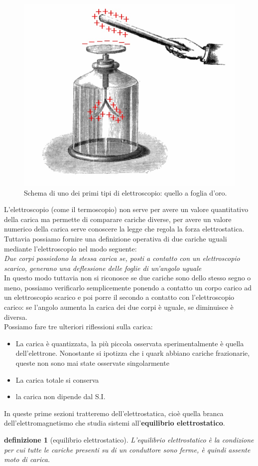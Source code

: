 \documentclass[10pt,a4paper]{article}
\newtheorem{definizione}{definizione}
\begin{document}
\begin{figure}[h!]
	\centering
	\includegraphics[width=0.4\linewidth]{images/elettroscopio}
	\caption{Schema di uno dei primi tipi di elettroscopio: quello a foglia d'oro.}
	\label{fig:elettroscopio}
\end{figure}
\FloatBarrier
L'elettroscopio (come il termoscopio) non serve per avere un valore quantitativo della carica ma permette di comparare cariche diverse, per avere un valore numerico della carica serve conoscere la legge che regola la forza elettrostatica. Tuttavia possiamo fornire una definizione operativa di due cariche uguali mediante l'elettroscopio nel modo seguente:\\
\textit{Due corpi possiedono la stessa carica se, posti a contatto con un elettroscopio scarico, generano una deflessione delle foglie di un'angolo uguale}\\
In questo modo tuttavia non si riconosce se due cariche sono dello stesso segno o meno, possiamo verificarlo semplicemente ponendo a contatto un corpo carico ad un elettroscopio scarico e poi porre il secondo a contatto con l'elettroscopio carico: se l'angolo aumenta la carica dei due corpi è uguale, se diminuisce è diversa.\\
Possiamo fare tre ulteriori riflessioni sulla carica:
\begin{itemize}
	\item La carica è quantizzata, la più piccola osservata sperimentalmente è quella dell'elettrone. Nonostante si ipotizza che i quark abbiano cariche frazionarie, queste non sono mai state osservate singolarmente
	\item La carica totale si conserva
	\item la carica non dipende dal S.I.
\end{itemize}
In queste prime sezioni tratteremo dell'elettrostatica, cioè quella branca dell'elettromagnetismo che studia sistemi all'\textbf{equilibrio elettrostatico}.
\begin{definizione}[equilibrio elettrostatico]
	L'equilibrio elettrostatico è la condizione per cui tutte le cariche presenti su di un conduttore sono ferme, è quindi assente moto di carica.
\end{definizione}
\end{document}
